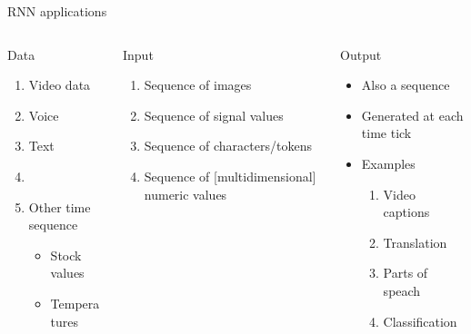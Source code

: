 \documentclass[aspectratio=169]{beamer}
\begin{document}
\begin{frame}{RNN applications}

\begin{columns}[t]
\begin{column}{0.3\textwidth}
Data
\begin{enumerate}
	\item Video data
	\item Voice
	\item Text
	\item[]
	\item Other time sequence
	\begin{itemize}
	\item Stock values 
	\item Temperatures 
	\end{itemize} 
\end{enumerate}
\end{column}
\begin{column}{0.4\textwidth}
Input
\begin{enumerate}
	\item Sequence of images
	\item Sequence of signal values
	\item Sequence of characters/tokens
	\item Sequence of [multidimensional] numeric values
\end{enumerate}
\end{column}
\begin{column}{0.3\textwidth}
Output
\begin{itemize}
	\item Also a sequence
	\item Generated at each time tick
	\item Examples
\begin{enumerate}
	\item Video captions
	\item Translation
	\item Parts of speach
	\item Classification
\end{enumerate}
\end{itemize}
\end{column}
\end{columns}
\end{frame}
\end{document}

